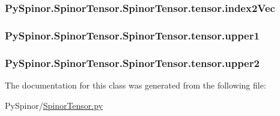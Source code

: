 \subsubsection[{index2\+Vec}]{\setlength{\rightskip}{0pt plus 5cm}Py\+Spinor.\+Spinor\+Tensor.\+Spinor\+Tensor.\+tensor.\+index2\+Vec}\label{class_py_spinor_1_1_spinor_tensor_1_1_spinor_tensor_1_1tensor_aec31a15cb9764166022dd2af292521ef}
\hypertarget{class_py_spinor_1_1_spinor_tensor_1_1_spinor_tensor_1_1tensor_a12de0d89eeef43572406df201e26ab66}{}
\subsubsection[{upper1}]{\setlength{\rightskip}{0pt plus 5cm}Py\+Spinor.\+Spinor\+Tensor.\+Spinor\+Tensor.\+tensor.\+upper1}\label{class_py_spinor_1_1_spinor_tensor_1_1_spinor_tensor_1_1tensor_a12de0d89eeef43572406df201e26ab66}
\hypertarget{class_py_spinor_1_1_spinor_tensor_1_1_spinor_tensor_1_1tensor_ac7c0b955050298326d2b805f6bcaf23a}{}
\subsubsection[{upper2}]{\setlength{\rightskip}{0pt plus 5cm}Py\+Spinor.\+Spinor\+Tensor.\+Spinor\+Tensor.\+tensor.\+upper2}\label{class_py_spinor_1_1_spinor_tensor_1_1_spinor_tensor_1_1tensor_ac7c0b955050298326d2b805f6bcaf23a}


The documentation for this class was generated from the following file\+:\begin{DoxyCompactItemize}
\item 
Py\+Spinor/\hyperlink{_spinor_tensor_8py}{Spinor\+Tensor.\+py}\end{DoxyCompactItemize}

